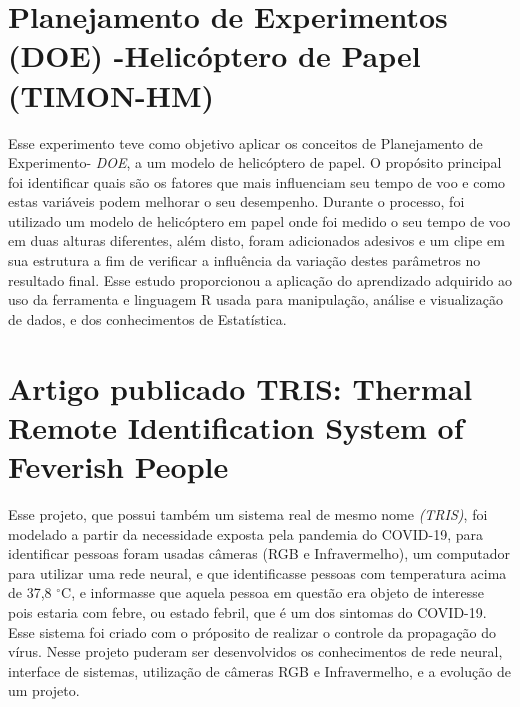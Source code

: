 \section{Planejamento de Experimentos (DOE) -Helicóptero de Papel (TIMON-HM)}
\label{sec:met_analise_doe}
Esse experimento teve como objetivo aplicar os conceitos de Planejamento de Experimento- \textit{DOE}, a um modelo de helicóptero de papel. O propósito principal foi identificar quais são os fatores que mais influenciam seu tempo de voo e como estas variáveis podem melhorar o seu desempenho. Durante o processo, foi utilizado um modelo de helicóptero em papel onde foi medido o seu tempo de voo em duas alturas diferentes, além disto, foram adicionados adesivos e um clipe em sua estrutura a fim de verificar a influência da variação destes parâmetros no resultado final. Esse estudo proporcionou a aplicação do aprendizado adquirido ao uso da ferramenta e linguagem R usada para manipulação, análise e visualização de dados, e dos conhecimentos de Estatística. 

\section{Artigo publicado TRIS: Thermal Remote Identification System of Feverish People }
\label{sec:met_tris}

Esse projeto, que possui também um sistema real de mesmo nome \textit{(TRIS)}, foi modelado a partir da necessidade exposta pela pandemia do COVID-19, para identificar pessoas  foram usadas câmeras (RGB e Infravermelho), um computador para utilizar uma rede neural, e que identificasse pessoas com temperatura acima de 37,8 $^\circ$C, e informasse que aquela pessoa em questão era objeto de interesse pois estaria com febre, ou estado febril, que é um dos sintomas do COVID-19. Esse sistema foi criado com o próposito de realizar o controle da propagação do vírus. Nesse projeto puderam ser desenvolvidos os conhecimentos de rede neural, interface de sistemas, utilização de câmeras RGB e Infravermelho, e a evolução de um projeto.